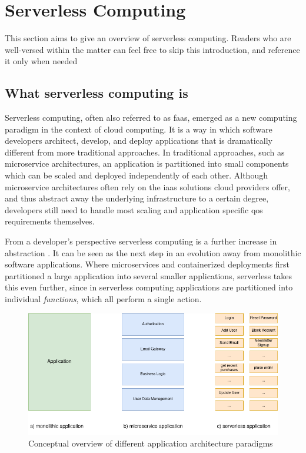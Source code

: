 \section{Serverless Computing}
This section aims to give an overview of serverless computing.
Readers who are well-versed within the matter can feel free to skip this introduction, and reference it only when needed
\subsection{What serverless computing is}
Serverless computing, often also referred to as \gls{faas}, emerged as a new computing paradigm in the context of cloud computing.
It is a way in which software developers architect, develop, and deploy applications that is dramatically different from more traditional approaches.
In traditional approaches, such as microservice architectures, an application is partitioned into small components which can be scaled and deployed independently of each other.
Although microservice architectures often rely on the \gls{iaas} solutions cloud providers offer, and thus abstract away the underlying infrastructure to a certain degree, developers still need to handle most scaling and application specific \gls{qos} requirements themselves.

From a developer's perspective serverless computing is a further increase in abstraction \cite{jonasCloudProgrammingSimplified2019}.
It can be seen as the next step in an evolution away from monolithic software applications.
Where microservices and containerized deployments first partitioned a large application into several smaller applications, serverless takes this even further, since in serverless computing applications are partitioned into individual \textit{functions}, which all perform a single action\cite{khandelwalTaureauDeconstructingServerless2020}.

\begin{figure}
    \centering
    \includegraphics[width=\columnwidth]{graphics/diagrams/monolith_micro_serverless.drawio.png}
    \caption{Conceptual overview of different application architecture paradigms}
    \label{fig:mono_micro_serverless}
\end{figure}

